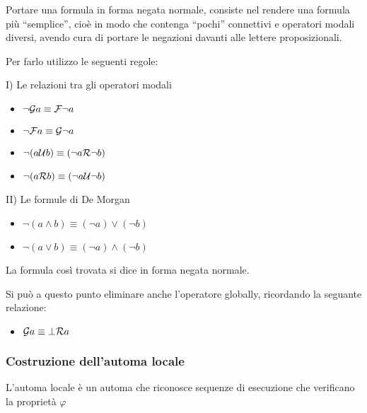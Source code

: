 Portare una formula in forma negata normale, consiste nel rendere
una formula più ``semplice'', cioè in modo che contenga ``pochi''
connettivi e operatori modali diversi, avendo cura di portare le negazioni
davanti alle lettere proposizionali.

Per farlo utilizzo le seguenti regole:

I) Le relazioni tra gli operatori modali 
\begin{itemize}
\item $\neg\mathcal{G}a\equiv\mathcal{F}\neg a$
\item $\neg\mathcal{F}a\equiv\mathcal{G}\neg a$
\item $\neg(a\mathcal{U}b)\equiv(\neg a\mathcal{R}\neg b)$
\item $\neg(a\mathcal{R}b)\equiv(\neg a\mathcal{U}\neg b)$
\end{itemize}
II) Le formule di De Morgan
\begin{itemize}
\item $\neg(a\wedge b)\equiv(\neg a)\vee(\neg b)$
\item $\neg(a\vee b)\equiv(\neg a)\wedge(\neg b)$
\end{itemize}
La formula così trovata si dice in forma negata normale.

Si può a questo punto eliminare anche l'operatore globally, ricordando
la seguante relazione:
\begin{itemize}
\item $\mathcal{G}a\equiv\bot\mathcal{R}a$
\end{itemize}

\subsubsection{Costruzione dell'automa locale}

L'automa locale è un automa che riconosce sequenze di esecuzione che
verificano la proprietà $\varphi$

